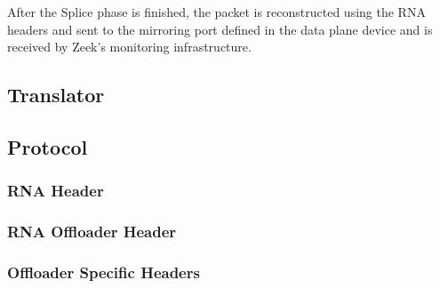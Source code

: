 After the Splice phase is finished, the packet is reconstructed using the RNA headers and sent to the mirroring port defined in the data plane device and is received by Zeek's monitoring infrastructure.

\subsection{Translator}



\subsection{Protocol}

\subsubsection{RNA Header}

\subsubsection{RNA Offloader Header}

\subsubsection{Offloader Specific Headers}

\newpage